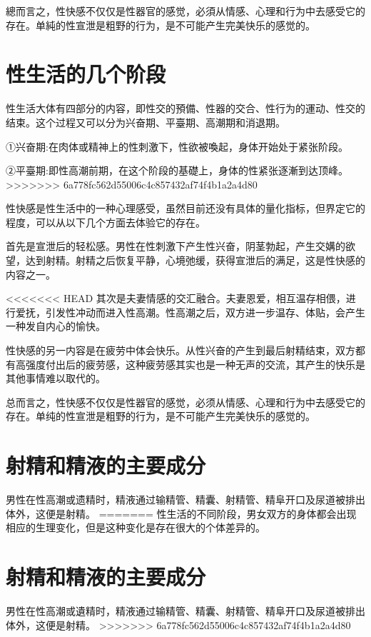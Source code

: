 \documentclass[12pt,UTF8]{ctexbook}
\begin{document}
總而言之，性快感不仅仅是性器官的感觉，必須从情感、心理和行为中去感受它的存在。单純的性宣泄是粗野的行为，是不可能产生完美快乐的感觉的。

\section{性生活的几个阶段}

性生活大体有四部分的内容，即性交的預備、性器的交合、性行为的運动、性交的结束。这个过程又可以分为兴奋期、平臺期、高潮期和消退期。

①兴奋期:在肉体或精神上的性刺激下，性欲被喚起，身体开始处于紧张阶段。

②平臺期:即性高潮前期，在这个阶段的基礎上，身体的性紧张逐漸到达顶峰。
>>>>>>> 6a778fc562d55006c4c857432af74f4b1a2a4d80

性快感是性生活中的一种心理感受，虽然目前还没有具体的量化指标，但界定它的程度，可以从以下几个方面去体验它的存在。

首先是宣泄后的轻松感。男性在性刺激下产生性兴奋，阴茎勃起，产生交媾的欲望，达到射精。射精之后恢复平静，心境弛缓，获得宣泄后的满足，这是性快感的内容之一。

<<<<<<< HEAD
其次是夫妻情感的交汇融合。夫妻恩爱，相互温存相偎，进行爱抚，引发性冲动而进入性高潮。性高潮之后，双方进一步温存、体贴，会产生一种发自内心的愉快。

性快感的另一内容是在疲劳中体会快乐。从性兴奋的产生到最后射精结束，双方都有高强度付出后的疲劳感，这种疲劳感其实也是一种无声的交流，其产生的快乐是其他事情难以取代的。

总而言之，性快感不仅仅是性器官的感觉，必须从情感、心理和行为中去感受它的存在。单纯的性宣泄是粗野的行为，是不可能产生完美快乐的感觉的。

\section{射精和精液的主要成分}

男性在性高潮或遗精时，精液通过输精管、精囊、射精管、精阜开口及尿道被排出体外，这便是射精。
=======
性生活的不同阶段，男女双方的身体都会出现相应的生理变化，但是这种变化是存在很大的个体差异的。

\section{射精和精液的主要成分}

男性在性高潮或遺精时，精液通过输精管、精囊、射精管、精阜开口及尿道被排出体外，这便是射精。
>>>>>>> 6a778fc562d55006c4c857432af74f4b1a2a4d80
\end{document}
